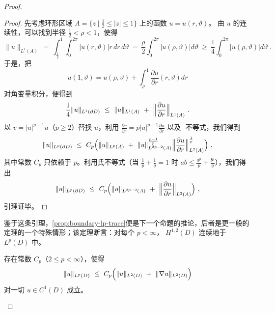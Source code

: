 \begin{proof}
\begin{proof}
先考虑环形区域 $A=\{z\mid\tfrac{1}{2}\leq|z|\leq1\}$ 上的函数 $u=u(r,\vartheta)$。%
由 $u$ 的连续性，可以找到半径 $\tfrac{1}{2}<\rho<1$，使得
\[
\|u\|_{L^{1}(A)}\ =\ \int_{\frac{1}{2}}^{1}\int_{0}^{2\pi}|u(r,\vartheta)|r\,dr\,d\vartheta\ =\ %
\frac{\rho}{2}\int_{0}^{2\pi}|u(\rho,\vartheta)|d\vartheta\ \geq\ %
\frac{1}{4}\int_{0}^{2\pi}|u(\rho,\vartheta)|d\vartheta\ .
\]
于是，把
\[
u(1,\vartheta)=u(\rho,\vartheta)+\int_{\rho}^{1}\frac{\partial u}{\partial r}(r,\vartheta)dr
\]
对角变量积分，便得到
\[
\frac{1}{4}\|u\|_{L^{1}(\partial D)}\ \leq\ \|u\|_{L^{1}(A)}\ +\ %
\Bigl\|\frac{\partial u}{\partial r}\Bigr\|_{L^{1}(A)}\ .
\]
以 $v=|u|^{p-1}u$（$p\geq2$）替换 $u$，利用%
 $\frac{\partial v}{\partial r}=p|u|^{p-1}\frac{\partial u}{\partial r}$ 以及%
\trCauchy-\trSchwarz{}不等式，我们得到
\[
\|u\|_{L^{p}(\partial D)}\ \leq\ C_{p}\Bigl(\|u\|_{L^{p}(A)}\ +\ %
\|u\|^{\frac{p-1}{p}}_{L^{2p-2}(A)}\Bigl\|\frac{\partial u}{\partial r}\Bigr\|^{\frac{1}{p}}_{L^{2}(A)}\Bigr)\ ,
\]
其中常数 $C_{p}$ 只依赖于 $p$。利用\trYoung{}氏不等式（当 $\tfrac{1}{p}+\tfrac{1}{q}=1$ 时%
 $ab\leq\frac{a^{p}}{p}+\frac{b^{q}}{q}$），我们得出
\[
\|u\|_{L^{p}(\partial D)}\ \leq\ C_{p}\Bigl(\|u\|_{L^{2p-2}(A)}\ +\ %
\Bigl\|\frac{\partial u}{\partial r}\Bigr\|_{L^{2}(A)}\Bigr)\ ,
\]
引理证毕。
\end{proof}

鉴于这条引理，\cref{prop:boundary-lp-trace}便是下一个命题的推论，后者是更一般的%
\trSobolev\trEmbedding{}定理的一个特殊情形；该定理断言：对每个 $p<\infty$，%
$H^{1,2}(D)$ 连续地\trEmbedding{}于 $L^{p}(D)$ 中。

\begin{proposition}\label{prop:domain-lp-estimate}
存在常数 $C_{p}$（$2\leq p<\infty$），使得
\[
\|u\|_{L^{p}(D)}\ \leq\ C_{p}\Bigl(\|u\|_{L^{2}(D)}\ +\ \|\nabla u\|_{L^{2}(D)}\Bigr)
\]
对一切 $u\in C^{1}(D)$ 成立。
\end{proposition}


\end{proof}
